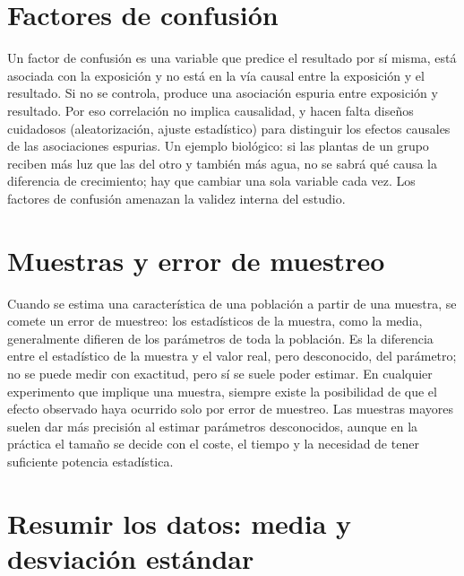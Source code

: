 \documentclass{book}
\begin{document}

\section{Factores de confusión}

Un factor de confusión es una variable que predice el resultado por sí misma, está asociada con la exposición y no está en la vía causal entre la exposición y el resultado. Si no se controla, produce una asociación espuria entre exposición y resultado. Por eso correlación no implica causalidad, y hacen falta diseños cuidadosos (aleatorización, ajuste estadístico) para distinguir los efectos causales de las asociaciones espurias. Un ejemplo biológico: si las plantas de un grupo reciben más luz que las del otro y también más agua, no se sabrá qué causa la diferencia de crecimiento; hay que cambiar una sola variable cada vez. Los factores de confusión amenazan la validez interna del estudio.


\section{Muestras y error de muestreo}

Cuando se estima una característica de una población a partir de una muestra, se comete un error de muestreo: los estadísticos de la muestra, como la media, generalmente difieren de los parámetros de toda la población. Es la diferencia entre el estadístico de la muestra y el valor real, pero desconocido, del parámetro; no se puede medir con exactitud, pero sí se suele poder estimar. En cualquier experimento que implique una muestra, siempre existe la posibilidad de que el efecto observado haya ocurrido solo por error de muestreo. Las muestras mayores suelen dar más precisión al estimar parámetros desconocidos, aunque en la práctica el tamaño se decide con el coste, el tiempo y la necesidad de tener suficiente potencia estadística.


\section{Resumir los datos: media y desviación estándar}
\end{document}
